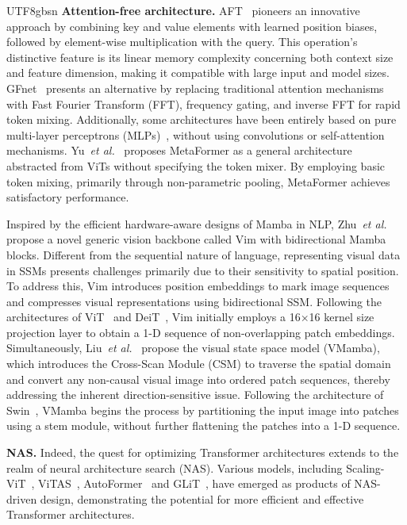 \documentclass[10pt,journal,compsoc]{IEEEtran}
\newcommand{\etal}{\emph{et al.}}
\newcommand{\<}{\left\langle}
\renewcommand{\>}{\right\rangle}
\newcommand{\1}{\mathbbm{1}}
\begin{document}
\begin{CJK}{UTF8}{gbsn}
\noindent\textbf{Attention-free architecture.}
AFT~\cite{zhai2021attention} pioneers an innovative approach by combining key and value elements with learned position biases, followed by element-wise multiplication with the query. This operation's distinctive feature is its linear memory complexity concerning both context size and feature dimension, making it compatible with large input and model sizes.
GFnet~\cite{rao2021global} presents an alternative by replacing traditional attention mechanisms with Fast Fourier Transform (FFT), frequency gating, and inverse FFT for rapid token mixing.
Additionally, some architectures have been entirely based on pure multi-layer perceptrons (MLPs)~\cite{touvron2022resmlp,tolstikhin2021mlp,guo2022hire,tang2022image,lian2021mlp,chen2021cyclemlp}, without using convolutions or self-attention mechanisms.
Yu~\etal~\cite{yu2022metaformer} proposes MetaFormer as a general architecture abstracted from ViTs without specifying the token mixer. By employing basic token mixing, primarily through non-parametric pooling, MetaFormer achieves satisfactory performance.

Inspired by the efficient hardware-aware designs of Mamba in NLP, Zhu~\etal~\cite{zhu2024vision} propose a novel generic vision backbone called Vim with bidirectional Mamba blocks. 
Different from the sequential nature of language, representing visual data in SSMs presents challenges primarily due to their sensitivity to spatial position. To address this, Vim introduces position embeddings to mark image sequences and compresses visual representations using bidirectional SSM. Following the architectures of ViT~\cite{Dosovitskiy2020AnII} and DeiT~\cite{Touvron2020TrainingDI}, Vim initially employs a 16×16 kernel size projection layer to obtain a 1-D sequence of non-overlapping patch embeddings.
Simultaneously, Liu~\etal~\cite{liu2024vmamba} propose the visual state space model (VMamba), which introduces the Cross-Scan Module (CSM) to traverse the spatial domain and convert any non-causal visual image into ordered patch sequences, thereby addressing the inherent direction-sensitive issue. Following the architecture of Swin~\cite{Liu2021SwinTH}, VMamba begins the process by partitioning the input image into patches using a stem module, without further flattening the patches into a 1-D sequence.

\noindent\textbf{NAS.}
Indeed, the quest for optimizing Transformer architectures extends to the realm of neural architecture search (NAS). Various models, including Scaling-ViT~\cite{zhai2022scaling}, ViTAS~\cite{su2022vitas},
AutoFormer~\cite{chen2021autoformer} and GLiT~\cite{chen2021glit}, have emerged as products of NAS-driven design, demonstrating the potential for more efficient and effective Transformer architectures. 


\end{CJK}
\end{document}
